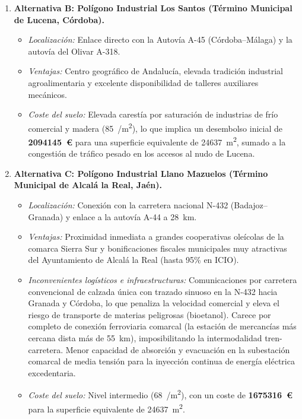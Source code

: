 \documentclass{report}
\begin{document}
\begin{enumerate}
\begin{itemize}
          \end{itemize}
    \item \textbf{Alternativa B: Polígono Industrial Los Santos (Término Municipal de Lucena, Córdoba).}
          \begin{itemize}
              \item \textit{Localización:} Enlace directo con la Autovía A-45 (Córdoba--Málaga) y la autovía del Olivar A-318.
              \item \textit{Ventajas:} Centro geográfico de Andalucía, elevada tradición industrial agroalimentaria y excelente disponibilidad de talleres auxiliares mecánicos.
              \item \textit{Coste del suelo:} Elevada carestía por saturación de industrias de frío comercial y madera (\SI{85}{/\metre\squared}), lo que implica un desembolso inicial de \textbf{\num{2094145}~€} para una superficie equivalente de \SI{24637}{\square\metre}, sumado a la congestión de tráfico pesado en los accesos al nudo de Lucena.
          \end{itemize}
    \item \textbf{Alternativa C: Polígono Industrial Llano Mazuelos (Término Municipal de Alcalá la Real, Jaén).}
          \begin{itemize}
              \item \textit{Localización:} Conexión con la carretera nacional N-432 (Badajoz--Granada) y enlace a la autovía A-44 a \SI{28}{\kilo\metre}.
              \item \textit{Ventajas:} Proximidad inmediata a grandes cooperativas oleícolas de la comarca Sierra Sur y bonificaciones fiscales municipales muy atractivas del Ayuntamiento de Alcalá la Real (hasta 95\% en ICIO).
              \item \textit{Inconvenientes logísticos e infraestructuras:} Comunicaciones por carretera convencional de calzada única con trazado sinuoso en la N-432 hacia Granada y Córdoba, lo que penaliza la velocidad comercial y eleva el riesgo de transporte de materias peligrosas (bioetanol). Carece por completo de conexión ferroviaria comarcal (la estación de mercancías más cercana dista más de \SI{55}{\kilo\metre}), imposibilitando la intermodalidad tren-carretera. Menor capacidad de absorción y evacuación en la subestación comarcal de media tensión para la inyección continua de energía eléctrica excedentaria.
              \item \textit{Coste del suelo:} Nivel intermedio (\SI{68}{/\metre\squared}), con un coste de \textbf{\num{1675316}~€} para la superficie equivalente de \SI{24637}{\square\metre}.
          \end{itemize}
\end{enumerate}
\end{document}
